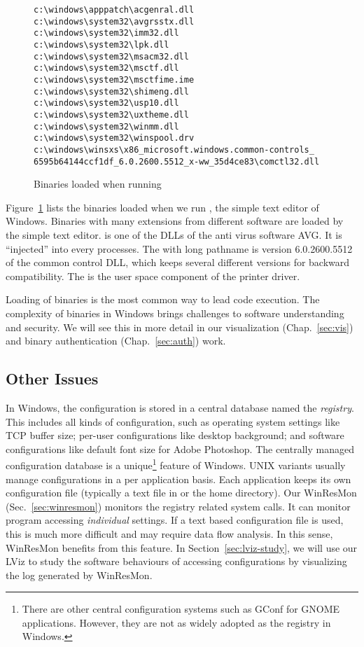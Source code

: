 \begin{figure}[htb]
\small
\begin{verbatim}
c:\windows\apppatch\acgenral.dll
c:\windows\system32\avgrsstx.dll
c:\windows\system32\imm32.dll
c:\windows\system32\lpk.dll
c:\windows\system32\msacm32.dll
c:\windows\system32\msctf.dll
c:\windows\system32\msctfime.ime
c:\windows\system32\shimeng.dll
c:\windows\system32\usp10.dll
c:\windows\system32\uxtheme.dll
c:\windows\system32\winmm.dll
c:\windows\system32\winspool.drv
c:\windows\winsxs\x86_microsoft.windows.common-controls_
6595b64144ccf1df_6.0.2600.5512_x-ww_35d4ce83\comctl32.dll
\end{verbatim}
\caption{Binaries loaded when running }
\label{fig:notepad-bin}
\end{figure}

Figure~\ref{fig:notepad-bin} lists the binaries loaded when we run
, the simple text editor of Windows.
Binaries with many extensions from different software
are loaded by the simple text editor.
 is one of the DLLs of the anti virus software AVG.
It is ``injected'' into every processes.
The  with long pathname is version 6.0.2600.5512 of
the common control DLL, which keeps several different versions
for backward compatibility. 
The  is the user space component of the printer
driver.

Loading of binaries is the most common way to lead code execution.
The complexity of binaries in Windows brings challenges to software understanding
and security.
We will see this in more detail in our visualization
(Chap.~\ref{sec:vis}) and binary authentication (Chap.~\ref{sec:auth}) work.

\subsection{Other Issues}

In Windows, the configuration is stored in a central database named the
{\em registry}.
This includes all kinds of configuration, such as
operating system settings like TCP buffer size;
per-user configurations like desktop background;
and software configurations like default font size
for Adobe Photoshop.
The centrally managed configuration database is a unique\footnote{
There are other central configuration systems such as
GConf for GNOME applications.
However, they are not as widely adopted as the registry in Windows.
} feature of Windows.
UNIX variants usually manage configurations in a per application basis.
Each application keeps its own configuration file (typically a
text file in  or the home directory).
Our WinResMon (Sec.~\ref{sec:winresmon}) monitors the registry
related system calls.
It can monitor program accessing {\em individual} settings.
If a text based configuration file is used, this is much more difficult
and may require data flow analysis.
In this sense, WinResMon benefits from this feature.
In Section~\ref{sec:lviz-study}, we will use our LViz to study the
software behaviours of accessing configurations by visualizing the
log generated by WinResMon.

